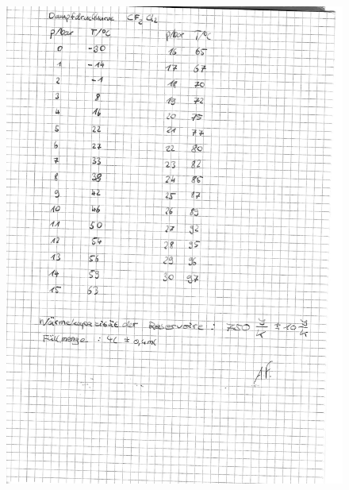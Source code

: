 \begin{figure}[htp]
  \centering
  \includegraphics[width=\textwidth]{content/originaldaten/2.jpg}
\end{figure}
